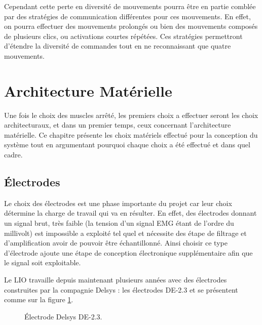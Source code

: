 \documentclass[letterpaper, twoside, 12pt, memoire, creativecommons, hyperref]{thETS}
\begin{document}
Cependant cette perte en diversité de mouvements pourra être en partie comblée par des stratégies de communication différentes pour ces mouvements. En effet, on pourra effectuer des mouvements prolongés ou bien des mouvements composés de plusieurs clics, ou activations courtes répétées. Ces stratégies permettront d'étendre la diversité de commandes tout en ne reconnaissant que quatre mouvements. 


\section{Architecture Matérielle}\label{CHarchimat}

Une fois le choix des muscles arrêté, les premiers choix a effectuer seront les choix architecturaux, et dans un premier temps, ceux concernant l'architecture matérielle. Ce chapitre présente les choix matériels effectué pour la conception du système tout en argumentant pourquoi chaque choix a été effectué et dans quel cadre.

\subsection{Électrodes}

Le choix des électrodes est une phase importante du projet car leur choix détermine la charge de travail qui va en résulter. En effet, des électrodes donnant un signal brut, très faible (la tension d'un signal EMG étant de l'ordre du millivolt) est impossible a exploité tel quel et nécessite des étape de filtrage et d'amplification avoir de pouvoir être échantillonné. Ainsi choisir ce type d'électrode ajoute une étape de conception électronique supplémentaire afin que le signal soit exploitable.

Le LIO travaille depuis maintenant plusieurs années avec des électrodes construites par la compagnie Delsys : les électrodes DE-2.3 et se présentent comme sur la figure \ref{fig:de2.3}. 

\begin{figure}
	\centering
	\caption{Électrode Delsys DE-2.3.}
	\label{fig:de2.3}
\end{figure}
\end{document}
